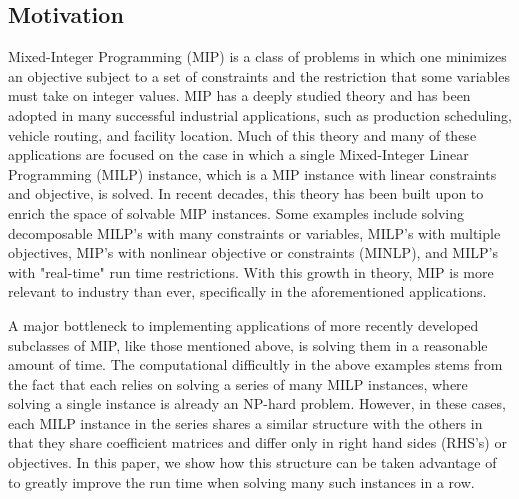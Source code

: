 \documentclass[10pt]{article}
\begin{document}
	\subsection{Motivation}	\label{ss:motivation}
	Mixed-Integer Programming (MIP) is a class of problems in which one minimizes an objective subject to a set of constraints and the restriction that some variables must take on integer values. MIP has a deeply studied theory and has been adopted in many successful industrial applications, such as production scheduling, vehicle routing, and facility location. Much of this theory and many of these applications are focused on the case in which a single Mixed-Integer Linear Programming (MILP) instance, which is a MIP instance with linear constraints and objective, is solved. In recent decades, this theory has been built upon to enrich the space of solvable MIP instances. Some examples include solving decomposable MILP's with many constraints or variables, MILP's with multiple objectives, MIP's with nonlinear objective or constraints (MINLP), and MILP's with "real-time" run time restrictions. With this growth in theory, MIP is more relevant to industry than ever, specifically in the aforementioned applications. 
	
	A major bottleneck to implementing applications of more recently developed subclasses of MIP, like those mentioned above, is solving them in a reasonable amount of time. The computational difficultly in the above examples stems from the fact that each relies on solving a series of many MILP instances, where solving a single instance is already an NP-hard problem. However, in these cases, each MILP instance in the series shares a similar structure with the others in that they share coefficient matrices and differ only in right hand sides (RHS's) or objectives. In this paper, we show how this structure can be taken advantage of to greatly improve the run time when solving many such instances in a row.
	
	
\end{document}
